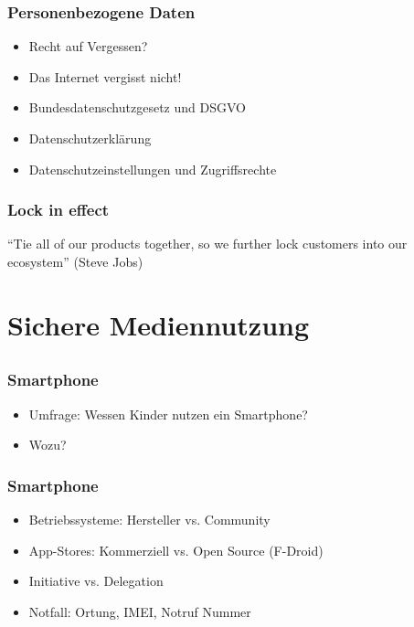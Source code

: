 \documentclass[12pt]{beamer}
\begin{document}
\begin{frame}
	\frametitle{Personenbezogene Daten}
	\begin{itemize}
		\item<2-> Recht auf Vergessen?
		\item<3-> Das Internet vergisst nicht!
		\item<4-> Bundesdatenschutzgesetz und DSGVO
		\item<5-> Datenschutzerklärung
		\item<6-> Datenschutzeinstellungen und Zugriffsrechte
	\end{itemize}
\end{frame}

\begin{frame}
  \frametitle{Lock in effect}
  \begin{center}
    ``Tie all of our products together, so we further lock customers into our ecosystem'' (Steve Jobs)
  \end{center}
\end{frame}


\section{Sichere Mediennutzung}
\subsection{}

\begin{frame}
	\frametitle{Smartphone}
	\begin{itemize}
		\item<1-> Umfrage: Wessen Kinder nutzen ein Smartphone?
		\item<2-> Wozu?
	\end{itemize}
\end{frame}

\begin{frame}
	\frametitle{Smartphone}
	\begin{itemize}
		\item<1-> Betriebssysteme: Hersteller vs. Community
		\item<2-> App-Stores: Kommerziell vs. Open Source (F-Droid)
		\item<3-> Initiative vs. Delegation
		\item<4-> Notfall: Ortung, IMEI, Notruf Nummer
	\end{itemize}
\end{frame}
\end{document}
